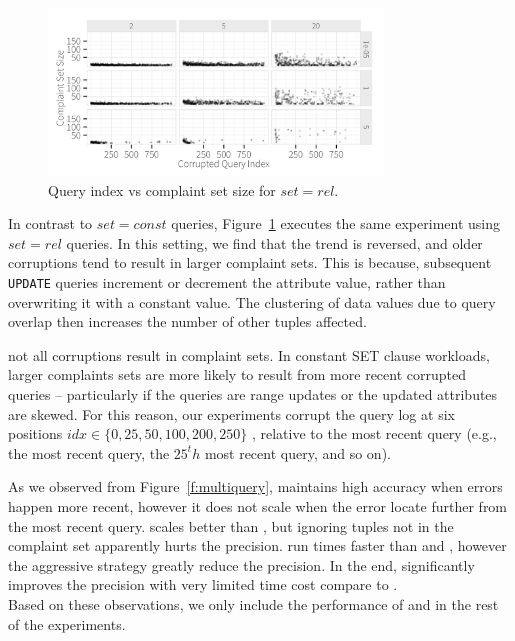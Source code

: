 \begin{figure}[h]
\centering
\includegraphics[width = 3.5in]{figures/qidxsimulation/qidx_v_ncomplaints_20attrs_rel}
\caption{Query index vs complaint set size for $set = rel$.}
\label{f:qidx_v_ncomplaints_rel} 
\end{figure}

In contrast to $set=const$ queries, Figure~\ref{f:qidx_v_ncomplaints_rel} executes the 
same experiment using $set=rel$ queries.  In this setting, we find that the trend is
reversed, and older corruptions tend to result in larger complaint sets.  This is because,
subsequent \texttt{UPDATE} queries increment or decrement the attribute value, rather than
overwriting it with a constant value.  The clustering of data values due to query overlap
then increases the number of other tuples affected.


not all corruptions result in complaint sets.
In constant SET clause workloads, larger complaints sets are more likely to
result from more recent corrupted queries -- particularly if the queries are range updates or
the updated attributes are skewed.
For this reason, our experiments corrupt the query log at six positions 
$idx \in \{0, 25, 50, 100, 200, 250\}$ , relative 
to the most recent query (e.g., the most recent query, the $25^th$ most recent query, and so on).



As we observed from Figure~\ref{f:multiquery}, \milpall maintains high accuracy when errors
happen more recent, however it does not scale when the error locate further from the most
recent query. \milptuple scales better than \milpall, but ignoring tuples not 
in the complaint set apparently hurts the precision. \milptuplestopearly run times faster
than \milpall and \milptuple, however the aggressive strategy greatly reduce the 
precision. In the end, \milpadvtuple significantly improves the precision with very limited
time cost compare to \milptuple. \\
Based on these observations, we only include the performance of \milpadvtuple and \milpadvall
in the rest of the experiments. 


